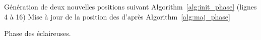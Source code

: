 \begin{algorithm}\label{alg:scout_phase}
  \SetAlgoVlined
  {
    {
      Génération de deux nouvelles positions suivant Algorithm~\ref{alg:init_phase}
      (lignes 4 à 16)\;
    }
  }
  Mise à jour de la position des \ASources d’après Algorithm~\ref{alg:maj_phase}\;
  \caption{Phase des éclaireuses.}
\end{algorithm}
